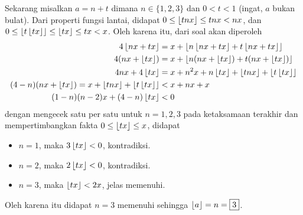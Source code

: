\begin{solusi}[1]
    Sekarang misalkan $a = n + t$ dimana $n \in \{1,2,3\}$ dan $0 < t < 1$ (ingat, $a$ bukan bulat). Dari properti fungsi lantai, didapat $0 \le \left\lfloor tnx \right\rfloor \le tnx < nx$, dan $0 \le \left\lfloor t\left\lfloor tx \right\rfloor \right\rfloor \le \left\lfloor tx \right\rfloor \le tx < x$. Oleh karena itu, dari soal akan diperoleh
    \begin{align*}
        4\left\lfloor nx+tx \right\rfloor &= x + \left\lfloor n\left\lfloor nx+tx \right\rfloor+t\left\lfloor nx+tx \right\rfloor \right\rfloor\\
        4(nx+\left\lfloor tx \right\rfloor) &= x + \left\lfloor n(nx+\left\lfloor tx \right\rfloor)+t(nx+\left\lfloor tx \right\rfloor) \right\rfloor\\
        4nx + 4\left\lfloor tx \right\rfloor &= x + n^2x + n\left\lfloor tx \right\rfloor + \left\lfloor tnx \right\rfloor + \left\lfloor t\left\lfloor tx \right\rfloor \right\rfloor\\
        (4-n)(nx+\left\lfloor tx \right\rfloor) = x + \left\lfloor tnx \right\rfloor + \left\lfloor t\left\lfloor tx \right\rfloor \right\rfloor&<x+nx+x\\
        (1-n)(n-2)x+(4-n)\left\lfloor tx \right\rfloor&<0
    \end{align*}
    dengan mengecek satu per satu untuk $n=1,2,3$ pada ketaksamaan terakhir dan mempertimbangkan fakta $0 \le \left\lfloor tx \right\rfloor \le x$, didapat
    \begin{itemize}
        \item $n=1$, maka $3\left\lfloor tx \right\rfloor < 0$, kontradiksi.
        \item $n=2$, maka $2\left\lfloor tx \right\rfloor < 0$, kontradiksi.
        \item $n=3$, maka $\left\lfloor tx \right\rfloor < 2x$, jelas memenuhi.
    \end{itemize}
    Oleh karena itu didapat $n=3$ memenuhi sehingga $\left\lfloor a \right\rfloor = n = \boxed{3}$.
\end{solusi}

